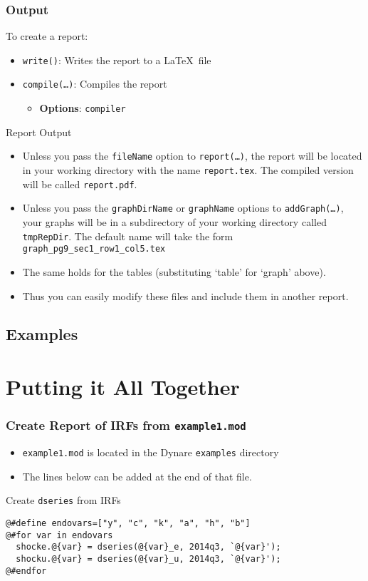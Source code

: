 \documentclass[10pt]{beamer}
\begin{document}
\begin{frame}
  \frametitle{Output}
  To create a report:
  \begin{itemize}
  \item \texttt{write()}: Writes the report to a \LaTeX\ file
  \item \texttt{compile(\ldots)}: Compiles the report
    \begin{itemize}
    \item \textbf{Options}: \texttt{compiler}
    \end{itemize}
  \end{itemize}
  Report Output
  \begin{itemize}
  \item Unless you pass the \texttt{fileName} option to \texttt{report(\ldots)}, the report will be located in your working directory with the name \texttt{report.tex}. The compiled version will be called \texttt{report.pdf}.
  \item Unless you pass the \texttt{graphDirName} or \texttt{graphName} options to \texttt{addGraph(\ldots)}, your graphs will be in a subdirectory of your working directory called \texttt{tmpRepDir}. The default name will take the form \texttt{graph\_pg9\_sec1\_row1\_col5.tex}
  \item The same holds for the tables (substituting `table' for `graph' above).
  \item Thus you can easily modify these files and include them in another report.
  \end{itemize}
\end{frame}


\subsection{Examples}

\section{Putting it All Together}
\begin{frame}[fragile=singleslide]
  \frametitle{Create Report of IRFs from \texttt{example1.mod}}
  \begin{itemize}
  \item \texttt{example1.mod} is located in the Dynare \texttt{examples} directory
  \item The lines below can be added at the end of that file.
  \end{itemize}
  \begin{block}{Create \texttt{dseries} from IRFs}
\begin{verbatim}
@#define endovars=["y", "c", "k", "a", "h", "b"]
@#for var in endovars
  shocke.@{var} = dseries(@{var}_e, 2014q3, `@{var}');
  shocku.@{var} = dseries(@{var}_u, 2014q3, `@{var}');
@#endfor
\end{verbatim}
  \end{block}
\end{frame}
\end{document}
